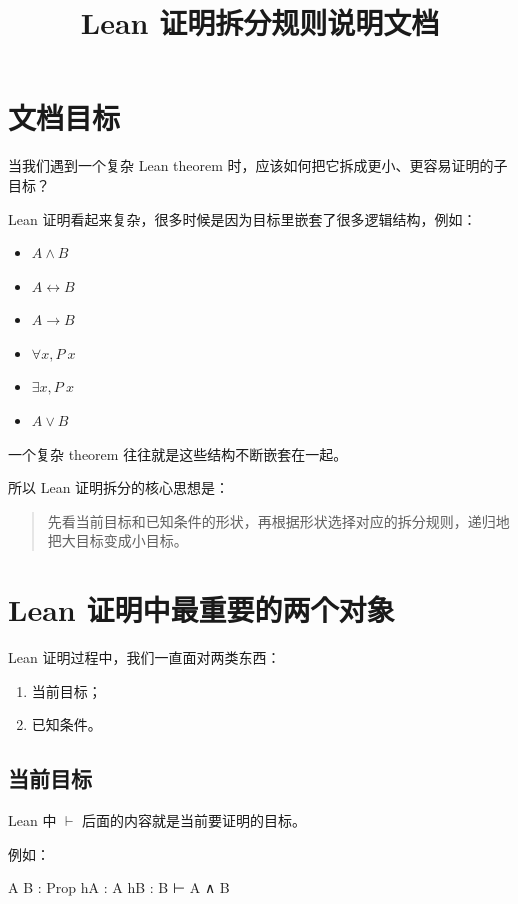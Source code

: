 \documentclass[UTF8,12pt]{ctexart}
\title{Lean 证明拆分规则说明文档}
\author{}
\date{}
\begin{document}
\maketitle
\tableofcontents
\newpage

\section{文档目标}

当我们遇到一个复杂 Lean theorem 时，应该如何把它拆成更小、更容易证明的子目标？

Lean 证明看起来复杂，很多时候是因为目标里嵌套了很多逻辑结构，例如：
\begin{itemize}
  \item \(A \land B\)
  \item \(A \leftrightarrow B\)
  \item \(A \to B\)
  \item \(\forall x, P\ x\)
  \item \(\exists x, P\ x\)
  \item \(A \lor B\)
\end{itemize}

一个复杂 theorem 往往就是这些结构不断嵌套在一起。

所以 Lean 证明拆分的核心思想是：

\begin{quote}
先看当前目标和已知条件的形状，再根据形状选择对应的拆分规则，递归地把大目标变成小目标。
\end{quote}

\section{Lean 证明中最重要的两个对象}

Lean 证明过程中，我们一直面对两类东西：
\begin{enumerate}
  \item 当前目标；
  \item 已知条件。
\end{enumerate}

\subsection{当前目标}

Lean 中 \(\vdash\) 后面的内容就是当前要证明的目标。

例如：

\begin{LeanCode}
A B : Prop
hA : A
hB : B
⊢ A ∧ B
\end{LeanCode}
\end{document}
